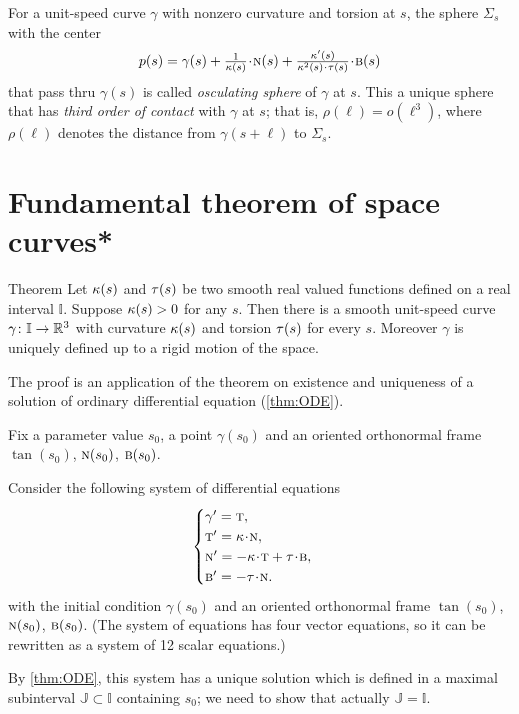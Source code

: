 For a unit-speed curve $\gamma$ with nonzero curvature and torsion at $s$,
the sphere $\Sigma_s$ with the center
\[p(s)=\gamma(s)+\tfrac1{\kur(s)}\cdot \norm(s)+\tfrac{\kur'(s)}{\kur^2(s)\cdot\tor(s)}\cdot\bi(s)\]
that pass thru $\gamma(s)$ is called \emph{osculating sphere} of $\gamma$ at $s$.
This a unique sphere that has \emph{third order of contact} with $\gamma$ at $s$;
that is, $\rho(\ell)=o(\ell^3)$, where $\rho(\ell)$ denotes the distance from $\gamma(s+\ell)$ to $\Sigma_s$.
 
\section*{Fundamental theorem of space curves*}

\begin{thm}{Theorem}\label{thm:fund-curves}
Let $\kappa(s)$ and $\tau(s)$ be two smooth real valued functions defined on a real interval $\mathbb{I}$.
Suppose $\kappa(s)>0$ for any $s$.
Then there is a smooth unit-speed curve $\gamma\colon\mathbb{I}\to\mathbb{R}^3$ with curvature $\kappa(s)$ and torsion $\tau(s)$ for every $s$.
Moreover $\gamma$ is uniquely defined up to a rigid motion of the space.
\end{thm}

The proof is an application of the theorem on existence and uniqueness of a solution of ordinary differential equation (\ref{thm:ODE}).

Fix a parameter value $s_0$, a point $\gamma(s_0)$ and an oriented orthonormal frame $\tan(s_0)$, $\textsc{n}(s_0)$, $\textsc{b}(s_0)$.

Consider the following system of differential equations
\[
\begin{cases}
\gamma'=\tan,
\\
\tan'=\kur\cdot\norm,
\\
\norm'=-\kur\cdot\tan+\tor\cdot\bi,
\\
\bi'=-\tor\cdot\norm.
\end{cases}
\]
with the initial condition $\gamma(s_0)$ and an oriented orthonormal frame $\tan(s_0)$, $\textsc{n}(s_0)$, $\textsc{b}(s_0)$.
(The system of equations has four vector equations, so it can be rewritten as a system of 12 scalar equations.)

By \ref{thm:ODE}, this system has a unique solution which is defined in a maximal subinterval $\mathbb{J}\subset \mathbb{I}$ containing $s_0$; we need to show that actually $\mathbb{J}= \mathbb{I}$.


